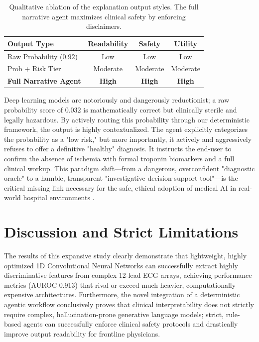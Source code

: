 \documentclass[10pt,twocolumn,letterpaper]{article}
\begin{document}
\begin{table}[h]
\centering
\begin{tabular}{lccc}
\toprule
\textbf{Output Type} & \textbf{Readability} & \textbf{Safety} & \textbf{Utility} \\
\midrule
Raw Probability ($0.92$) & Low & Low & Low \\
Prob + Risk Tier & Moderate & Moderate & Moderate \\
\textbf{Full Narrative Agent} & \textbf{High} & \textbf{High} & \textbf{High} \\
\bottomrule
\end{tabular}
\vspace{0.1cm}
\caption{Qualitative ablation of the explanation output styles. The full narrative agent maximizes clinical safety by enforcing disclaimers.}
\label{tab:ablation}
\end{table}

Deep learning models are notoriously and dangerously reductionist; a raw probability score of $0.032$ is mathematically correct but clinically sterile and legally hazardous. By actively routing this probability through our deterministic framework, the output is highly contextualized. The agent explicitly categorizes the probability as a "low risk," but more importantly, it actively and aggressively refuses to offer a definitive "healthy" diagnosis. It instructs the end-user to confirm the absence of ischemia with formal troponin biomarkers and a full clinical workup. This paradigm shift—from a dangerous, overconfident "diagnostic oracle" to a humble, transparent "investigative decision-support tool"—is the critical missing link necessary for the safe, ethical adoption of medical AI in real-world hospital environments \cite{sendak2020real}.

\section{Discussion and Strict Limitations}

The results of this expansive study clearly demonstrate that lightweight, highly optimized 1D Convolutional Neural Networks can successfully extract highly discriminative features from complex 12-lead ECG arrays, achieving performance metrics (AUROC 0.913) that rival or exceed much heavier, computationally expensive architectures. Furthermore, the novel integration of a deterministic agentic workflow conclusively proves that clinical interpretability does not strictly require complex, hallucination-prone generative language models; strict, rule-based agents can successfully enforce clinical safety protocols and drastically improve output readability for frontline physicians.
\end{document}
